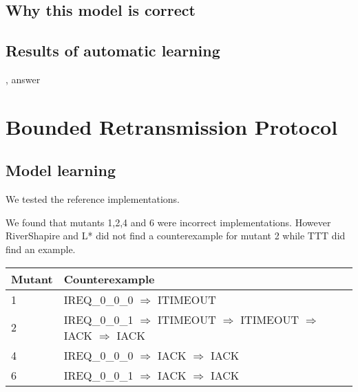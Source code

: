\documentclass[11pt,a4paper]{article}
\begin{document}
\subsection{Why this model is correct}



\subsection{Results of automatic learning}

, answer


\section{Bounded Retransmission Protocol}

\subsection{Model learning}
We tested the reference implementations.

We found that mutants 1,2,4 and 6 were incorrect implementations.
However RiverShapire and L* did not find a counterexample for mutant 2
while TTT did find an example.
                                  
\begin{center}
\begin{tabular}{l|l}                                          
\textbf{Mutant} & \textbf{Counterexample}\\
\hline
1 & IREQ\_0\_0\_0 $\Rightarrow$ ITIMEOUT\\
2 & IREQ\_0\_0\_1 $\Rightarrow$ ITIMEOUT $\Rightarrow$ ITIMEOUT $\Rightarrow$ IACK $\Rightarrow$ IACK\\
4 & IREQ\_0\_0\_0 $\Rightarrow$ IACK $\Rightarrow$ IACK\\
6 & IREQ\_0\_0\_1 $\Rightarrow$ IACK $\Rightarrow$ IACK\\
\end{tabular}
\end{center}
\end{document}
